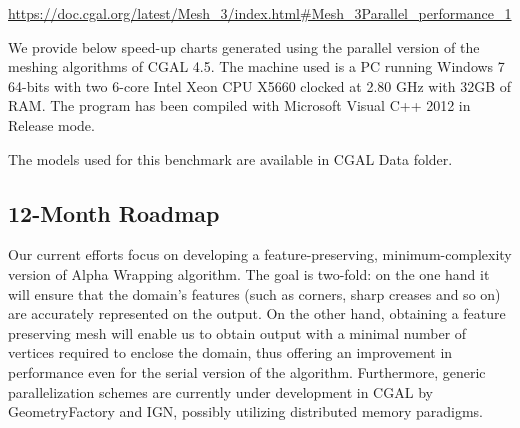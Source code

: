 \url{https://doc.cgal.org/latest/Mesh_3/index.html#Mesh_3Parallel_performance_1}


We provide below speed-up charts generated using the parallel version of the meshing algorithms of CGAL 4.5. The machine used is a PC running Windows 7 64-bits with two 6-core Intel Xeon CPU X5660 clocked at 2.80 GHz with 32GB of RAM. The program has been compiled with Microsoft Visual C++ 2012 in Release mode.


The models used for this benchmark are available in CGAL Data folder.




\subsection{12-Month Roadmap}
\label{sec:WP1:CGAL:roadmap}



Our current efforts focus on developing a feature-preserving, minimum-complexity version of Alpha Wrapping algorithm.
The goal is two-fold: on the one hand it will ensure that the domain's features (such as corners, sharp creases and so on) are accurately represented
on the output. On the other hand, obtaining a feature preserving mesh will enable us to obtain output with a minimal number of vertices
required to enclose the domain, thus offering an improvement in performance even for the serial version of the algorithm. 
Furthermore, generic parallelization schemes are currently under development in CGAL by GeometryFactory and IGN,
possibly utilizing distributed memory paradigms. 


